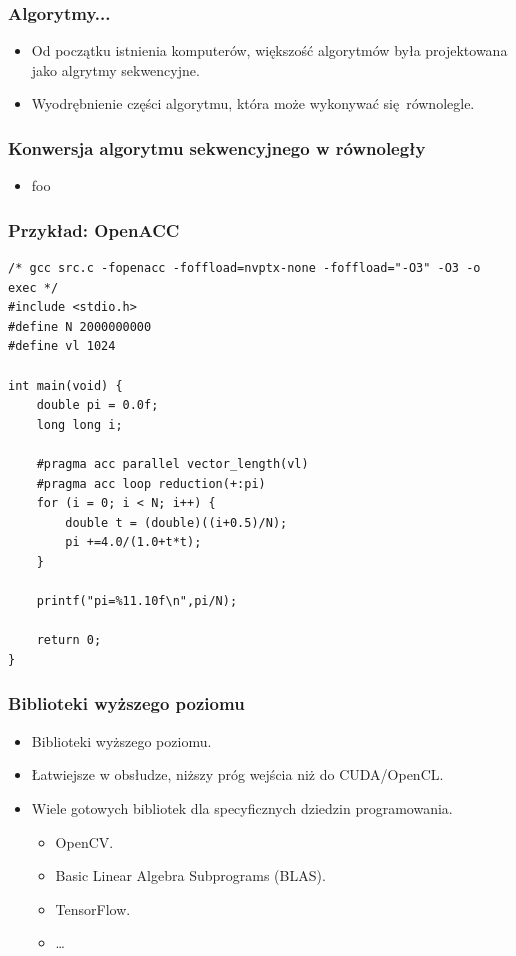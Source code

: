 \documentclass[dvipsnames,table]{beamer}
\begin{document}
\begin{frame}
	\frametitle{Algorytmy...}
\begin{itemize}
	\item Od początku istnienia komputerów, większość algorytmów była projektowana jako algrytmy sekwencyjne.
	\item Wyodrębnienie części algorytmu, która może wykonywać się równolegle.
\end{itemize}
\end{frame}

\begin{frame}
	\frametitle{Konwersja algorytmu sekwencyjnego w równoległy}
\begin{itemize}
	\item foo
\end{itemize}
\end{frame}





\begin{frame}[fragile]
	\frametitle{Przykład: OpenACC}
\begin{lstlisting}
/* gcc src.c -fopenacc -foffload=nvptx-none -foffload="-O3" -O3 -o exec */
#include <stdio.h>
#define N 2000000000
#define vl 1024

int main(void) {
	double pi = 0.0f;
	long long i;

	#pragma acc parallel vector_length(vl)
	#pragma acc loop reduction(+:pi)
	for (i = 0; i < N; i++) {
		double t = (double)((i+0.5)/N);
		pi +=4.0/(1.0+t*t);
	}

	printf("pi=%11.10f\n",pi/N);

	return 0;
}
\end{lstlisting}
\end{frame}

\begin{frame}
	\frametitle{Biblioteki wyższego poziomu}
\begin{itemize}
	\item Biblioteki wyższego poziomu.
	\item Łatwiejsze w obsłudze, niższy próg wejścia niż do CUDA/OpenCL.
	\item Wiele gotowych bibliotek dla specyficznych dziedzin programowania.
	\begin{itemize}
		\item OpenCV.
		\item Basic Linear Algebra Subprograms (BLAS).
		\item TensorFlow.
		\item \ldots 
	\end{itemize}
\end{itemize}
\end{frame}
\end{document}
